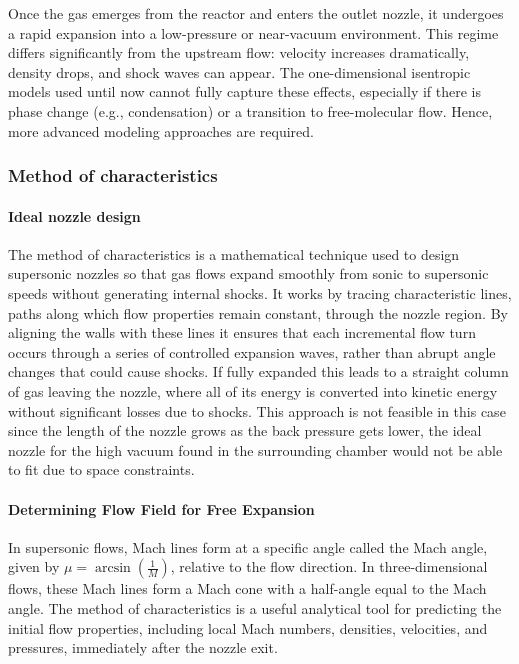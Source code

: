 Once the gas emerges from the reactor and enters the outlet nozzle, it undergoes a rapid expansion into a low-pressure or near-vacuum environment.
This regime differs significantly from the upstream flow: velocity increases dramatically, density drops, and shock waves can appear.
The one-dimensional isentropic models used until now cannot fully capture these effects, especially if there is phase change (e.g., condensation) or a transition to free-molecular flow.
Hence, more advanced modeling approaches are required.
\cite{jousten_handbook_2016, anderson2021modern}

\subsubsection*{Method of characteristics}

	\paragraph*{Ideal nozzle design}
		The method of characteristics is a mathematical technique used to design supersonic nozzles so that gas flows expand smoothly from sonic to supersonic speeds without generating internal shocks.
		It works by tracing characteristic lines, paths along which flow properties remain constant, through the nozzle region.
		By aligning the walls with these lines it ensures that each incremental flow turn occurs through a series of controlled expansion waves, rather than abrupt angle changes that could cause shocks.
		If fully expanded this leads to a straight column of gas leaving the nozzle, where all of its energy is converted into kinetic energy without significant losses due to shocks.
		This approach is not feasible in this case since the length of the nozzle grows as the back pressure gets lower, the ideal nozzle for the high vacuum found in the surrounding chamber would not be able to fit due to space constraints.
		\cite{khare_rocket_2021, fernandes_shape_2023}

	\paragraph*{Determining Flow Field for Free Expansion}
		In supersonic flows, Mach lines form at a specific angle called the Mach angle, given by $\mu = \arcsin\left(\frac{1}{M}\right)$, relative to the flow direction.
		In three-dimensional flows, these Mach lines form a Mach cone with a half-angle equal to the Mach angle.
		The method of characteristics is a useful analytical tool for predicting the initial flow properties, including local Mach numbers, densities, velocities, and pressures, immediately after the nozzle exit.


